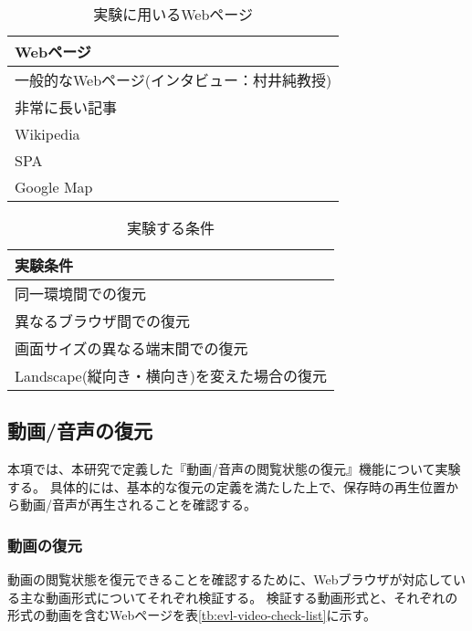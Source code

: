 \begin{table}[htbp]
  \label{tb:evl-basic-web-contents}
  \caption{実験に用いるWebページ}
  \begin{center}
    \begin{tabular}{|l|}
    \hline
    Webページ  \\ \hline
    一般的なWebページ(インタビュー：村井純教授) \\ \hline
    非常に長い記事 \\ \hline
    Wikipedia \\ \hline
    SPA \\ \hline
    Google Map \\ \hline
    \end{tabular}
  \end{center}
\end{table}

\begin{table}[htbp]
  \label{tb:evl-basic-conditions}
  \caption{実験する条件}
  \begin{center}
    \begin{tabular}{|l|}
    \hline
    実験条件  \\ \hline
    同一環境間での復元 \\ \hline
    異なるブラウザ間での復元 \\ \hline
    画面サイズの異なる端末間での復元 \\ \hline
    Landscape(縦向き・横向き)を変えた場合の復元 \\ \hline
    \end{tabular}
  \end{center}
\end{table}

\subsection{動画/音声の復元}
本項では、本研究で定義した『動画/音声の閲覧状態の復元』機能について実験する。
具体的には、基本的な復元の定義を満たした上で、保存時の再生位置から動画/音声が再生されることを確認する。

\subsubsection{動画の復元}
動画の閲覧状態を復元できることを確認するために、Webブラウザが対応している主な動画形式についてそれぞれ検証する。
検証する動画形式と、それぞれの形式の動画を含むWebページを表\ref{tb:evl-video-check-list}に示す。

